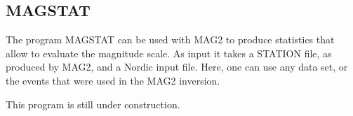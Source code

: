 \subsection{MAGSTAT}
\label{MAGSTAT}

The program MAGSTAT can be used with MAG2 to produce statistics that 
allow to evaluate the magnitude scale. 
As input it takes a STATION file, as produced by MAG2, and a Nordic 
input file. Here, one can use any data set, 
or the events that were used in the MAG2 inversion.

This program is still under construction. 




